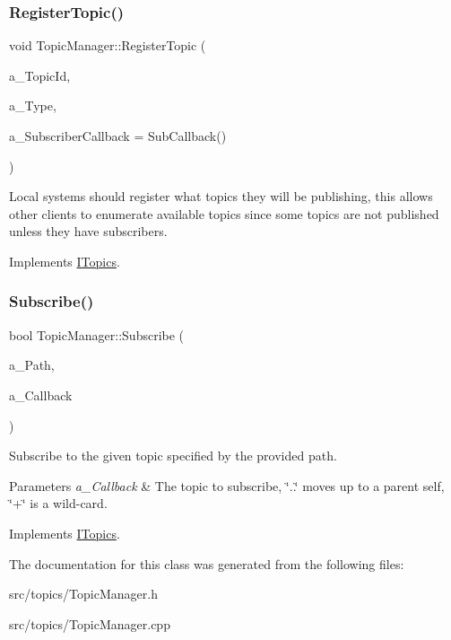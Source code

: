 \subsubsection{\texorpdfstring{Register\+Topic()}{RegisterTopic()}}
{\footnotesize\ttfamily void Topic\+Manager\+::\+Register\+Topic (\begin{DoxyParamCaption}\item[{const std\+::string \&}]{a\+\_\+\+Topic\+Id,  }\item[{const std\+::string \&}]{a\+\_\+\+Type,  }\item[{Sub\+Callback}]{a\+\_\+\+Subscriber\+Callback = {\ttfamily SubCallback()} }\end{DoxyParamCaption})\hspace{0.3cm}{\ttfamily [virtual]}}

Local systems should register what topics they will be publishing, this allows other clients to enumerate available topics since some topics are not published unless they have subscribers. 

Implements \hyperlink{class_i_topics_aaef29cbe6b8c089b22689a4ece3f711a}{I\+Topics}.

\mbox{\label{class_topic_manager_a45df0bdd5a5d9ba4dfbb471726cf04c5}} 
\subsubsection{\texorpdfstring{Subscribe()}{Subscribe()}}
{\footnotesize\ttfamily bool Topic\+Manager\+::\+Subscribe (\begin{DoxyParamCaption}\item[{const std\+::string \&}]{a\+\_\+\+Path,  }\item[{Payload\+Callback}]{a\+\_\+\+Callback }\end{DoxyParamCaption})\hspace{0.3cm}{\ttfamily [virtual]}}



Subscribe to the given topic specified by the provided path. 


\begin{DoxyParams}{Parameters}
{\em a\+\_\+\+Callback} & The topic to subscribe, \char`\"{}..\char`\"{} moves up to a parent self, \char`\"{}+\char`\"{} is a wild-\/card. \\
\hline
\end{DoxyParams}


Implements \hyperlink{class_i_topics_a6381bbfcfc39b3630a802bae4c7c5337}{I\+Topics}.



The documentation for this class was generated from the following files\+:\begin{DoxyCompactItemize}
\item 
src/topics/Topic\+Manager.\+h\item 
src/topics/Topic\+Manager.\+cpp\end{DoxyCompactItemize}

